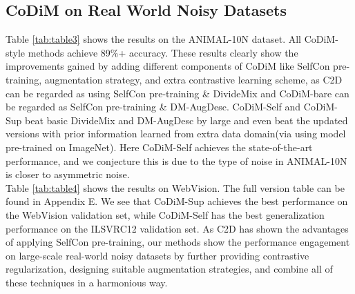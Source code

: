 \documentclass[letterpaper]{article} \usepackage{aaai22}  \usepackage{times}  \usepackage{helvet}  \usepackage{courier}  \usepackage[hyphens]{url}  \usepackage{graphicx} \usepackage{subfigure}
\begin{document}
\subsection{CoDiM on Real World Noisy Datasets}
Table \ref{tab:table3} shows the results on the ANIMAL-10N dataset. All CoDiM-style methods achieve 89\%+ accuracy. These results clearly show the improvements gained by adding different components of CoDiM like SelfCon pre-training, augmentation strategy, and extra contrastive learning scheme, as C2D can be regarded as using SelfCon pre-training \& DivideMix and CoDiM-bare can be regarded as SelfCon pre-training \& DM-AugDesc. CoDiM-Self and CoDiM-Sup beat basic DivideMix and DM-AugDesc by large and even beat the updated versions with prior information learned from extra data domain(via using model pre-trained on ImageNet). Here CoDiM-Self achieves the state-of-the-art performance, and we conjecture this is due to the type of noise in ANIMAL-10N is closer to asymmetric noise. \\
Table \ref{tab:table4} shows the results on WebVision. The full version table can be found in Appendix E. We see that CoDiM-Sup achieves the best performance on the WebVision validation set, while CoDiM-Self has the best generalization performance on the ILSVRC12 validation set. As C2D has shown the advantages of applying SelfCon pre-training, our methods show the performance engagement on large-scale real-world noisy datasets by further providing contrastive regularization, designing suitable augmentation strategies, and combine all of these techniques in a harmonious way.
\end{document}
